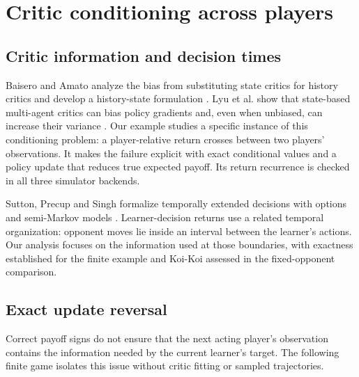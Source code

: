 \section{Critic conditioning across players}
\label{sec:observer}
\subsection{Critic information and decision times}
Baisero and Amato analyze the bias from substituting state critics for history
critics and develop a history-state formulation \cite{baisero2022asymmetric}.
Lyu et al. show that state-based multi-agent critics can bias policy gradients
and, even when unbiased, can increase their variance \cite{lyu2022critics}.
Our example studies a specific instance of this conditioning problem: a
player-relative return crosses between two players' observations. It makes the
failure explicit with exact conditional values and a policy update that reduces
true expected payoff. Its return recurrence is checked in all three simulator
backends.

Sutton, Precup and Singh formalize temporally extended decisions with options
and semi-Markov models \cite{sutton1999options}. Learner-decision returns use a
related temporal organization: opponent moves lie inside an interval between
the learner's actions. Our analysis focuses on the information used at those
boundaries, with exactness established for the finite example and Koi-Koi
assessed in the fixed-opponent comparison.

\subsection{Exact update reversal}
Correct payoff signs do not ensure that the next acting player's observation
contains the information needed by the current learner's target. The following
finite game isolates this issue without critic fitting or sampled trajectories.

